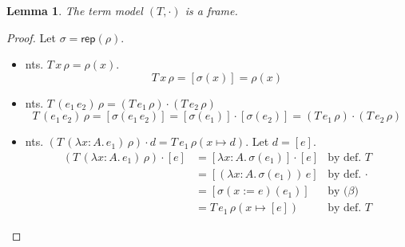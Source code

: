 \documentclass{tufte-handout}
\newcommand{\LAM}[1]{\lambda #1.\,}
\newcommand{\APP}[0]{\,}
\newcommand{\of}[0]{\!:\!}
\newcommand{\by}[0]{\!:=\!}
\newcommand{\ext}[3]{#3(#1{\mapsto}#2)}
\newtheorem{lemma}[theorem]{Lemma}
\begin{document}
\begin{lemma}
  \label{lem:term-frame}
  The term model $(T,\cdot)$ is a frame.
\end{lemma}
\begin{proof} Let $\sigma = \mathsf{rep}(\rho)$.
  \begin{itemize}
  \item nts. $T\,x\,\rho = \rho(x)$.
    \[
     T\,x\,\rho = [\sigma(x)] = \rho(x)
    \]
    
  \item nts. $T\,(e_1\APP e_2)\,\rho = (T\,e_1\,\rho) \cdot (T\,e_2\,\rho)$
    \[
    T\,(e_1\APP e_2)\,\rho
    = [\sigma(e_1\APP e_2)]
    = [\sigma(e_1)] \cdot [\sigma(e_2)]
    = (T\,e_1\,\rho ) \cdot (T\,e_2\,\rho)
    \]

  \item nts. $(T\,(\LAM{x\of A} e_1)\,\rho) \cdot d =
    T\,e_1\,\ext{x}{d}{\rho}$. Let $d=[e]$.
    \begin{align*}
    (T\,(\LAM{x\of A} e_1)\,\rho) \cdot [e]
    &= [\LAM{x\of A}\sigma(e_1)] \cdot [e] & \text{by def. $T$}\\
    &= [(\LAM{x\of A}\sigma(e_1)) \APP e] & \text{by def. $\cdot$}\\
    &= [\sigma(x\by e)(e_1)] & \text{by ($\beta$)}\\
    &= T\,e_1\,\ext{x}{[e]}{\rho} & \text{by def. $T$}
    \end{align*}
    
  \end{itemize}
  
\end{proof}
\end{document}
